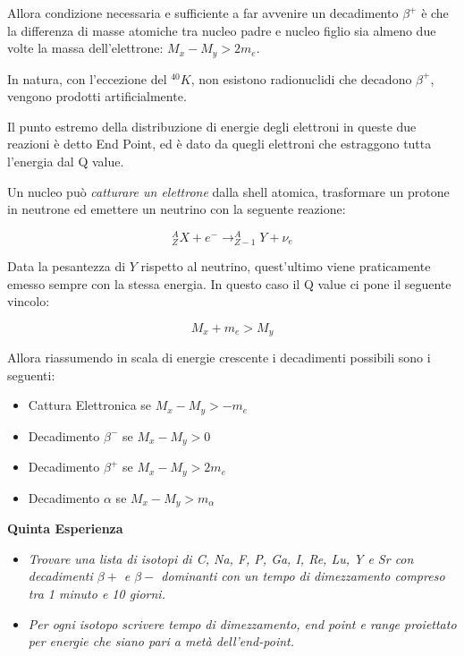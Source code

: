 Allora condizione necessaria e sufficiente a far avvenire un decadimento $\beta^+$ è che la differenza di masse atomiche tra nucleo padre e nucleo figlio sia almeno due volte la massa dell'elettrone: $M_x-M_y>2m_e$.

In natura, con l'eccezione del $^{40}K$, non esistono radionuclidi che decadono $\beta^+$, vengono prodotti artificialmente.

Il punto estremo della distribuzione di energie degli elettroni in queste due reazioni è detto End Point, ed è dato da quegli elettroni che estraggono tutta l'energia dal Q value.

Un nucleo può \emph{catturare un elettrone} dalla shell atomica, trasformare un protone in neutrone ed emettere un neutrino con la seguente reazione:

\begin{equation}
^A_ZX+e^- \longrightarrow _{Z-1}^AY+\nu_e
\end{equation}

Data la pesantezza di $Y$ rispetto al neutrino, quest'ultimo viene praticamente emesso sempre con la stessa energia. In questo caso il Q value ci pone il seguente vincolo:

\begin{equation}
M_x+m_e>M_y
\end{equation}

Allora riassumendo in scala di energie crescente i decadimenti possibili sono i seguenti:

\begin{itemize}
\item Cattura Elettronica se $M_x-M_y>-m_e$
\item Decadimento $\beta^-$ se $M_x-M_y>0$
\item Decadimento $\beta^+$ se $M_x-M_y>2m_e$
\item Decadimento $\alpha$ se $M_x-M_y>m_{\alpha}$
\end{itemize}

\textbf{Quinta Esperienza}

\begin{itemize}
\item \emph{Trovare una lista di isotopi di C, Na, F, P, Ga, I, Re, Lu, Y e Sr con decadimenti $\beta+$ e $\beta-$ dominanti con un tempo di dimezzamento compreso tra 1 minuto e 10 giorni.}
\item \emph{Per ogni isotopo scrivere tempo di dimezzamento, end point e range proiettato per energie che siano pari a metà dell'end-point.}
\end{itemize}



